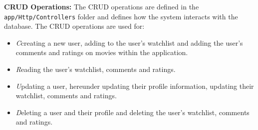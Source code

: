 \textbf{CRUD Operations:}
The CRUD operations are defined in the \texttt{app/Http/Controllers} folder and defines how the system interacts with the database.
The CRUD operations are used for:
\begin{itemize}
    \item \textit{C}creating a new user, adding to the user's watchlist and adding the user's comments and ratings on movies within the application.
    \item \textit{R}eading the user's watchlist, comments and ratings.
    \item \textit{U}pdating a user, hereunder updating their profile information, updating their watchlist, comments and ratings.
    \item \textit{D}eleting a user and their profile and deleting the user's watchlist, comments and ratings.
\end{itemize}


